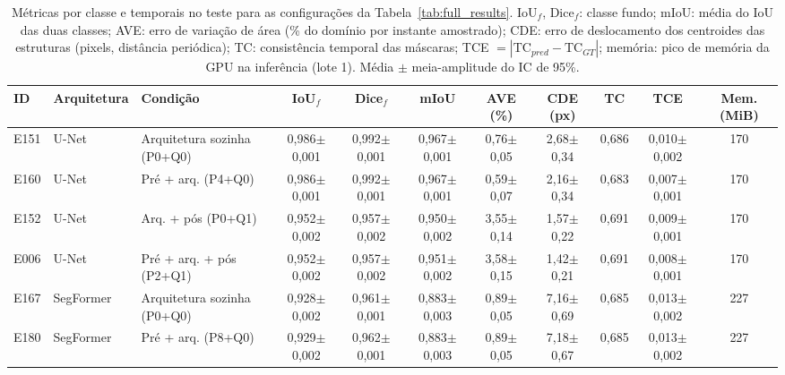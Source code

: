 \begin{table}[t]
\centering
\caption{Métricas por classe e temporais no teste para as configurações da Tabela~\ref{tab:full_results}. IoU$_{f}$, Dice$_{f}$: classe fundo; mIoU: média do IoU das duas classes; AVE: erro de variação de área (\% do domínio por instante amostrado); CDE: erro de deslocamento dos centroides das estruturas (pixels, distância periódica); TC: consistência temporal das máscaras; TCE $=|\mathrm{TC}_{pred}-\mathrm{TC}_{GT}|$; memória: pico de memória da GPU na inferência (lote 1). Média $\pm$ meia-amplitude do IC de 95\%.}
\label{tab:classwise_temporal}
\scriptsize
\setlength{\tabcolsep}{3pt}
\begin{tabularx}{\textwidth}{L{0.7cm} L{1.6cm} Y c c c c c c c c}
\toprule
\textbf{ID} & \textbf{Arquitetura} & \textbf{Condição} & \textbf{IoU$_{f}$} & \textbf{Dice$_{f}$} & \textbf{mIoU} & \textbf{AVE (\%)} & \textbf{CDE (px)} & \textbf{TC} & \textbf{TCE} & \textbf{Mem. (MiB)} \\
\midrule
E151 & U-Net & Arquitetura sozinha (P0+Q0) & 0,986{\scriptsize$\pm$0,001} & 0,992{\scriptsize$\pm$0,001} & 0,967{\scriptsize$\pm$0,001} & 0,76{\scriptsize$\pm$0,05} & 2,68{\scriptsize$\pm$0,34} & 0,686 & 0,010{\scriptsize$\pm$0,002} & 170 \\
E160 & U-Net & Pré + arq. (P4+Q0) & 0,986{\scriptsize$\pm$0,001} & 0,992{\scriptsize$\pm$0,001} & 0,967{\scriptsize$\pm$0,001} & 0,59{\scriptsize$\pm$0,07} & 2,16{\scriptsize$\pm$0,34} & 0,683 & 0,007{\scriptsize$\pm$0,001} & 170 \\
E152 & U-Net & Arq. + pós (P0+Q1) & 0,952{\scriptsize$\pm$0,002} & 0,957{\scriptsize$\pm$0,002} & 0,950{\scriptsize$\pm$0,002} & 3,55{\scriptsize$\pm$0,14} & 1,57{\scriptsize$\pm$0,22} & 0,691 & 0,009{\scriptsize$\pm$0,001} & 170 \\
E006 & U-Net & Pré + arq. + pós (P2+Q1) & 0,952{\scriptsize$\pm$0,002} & 0,957{\scriptsize$\pm$0,002} & 0,951{\scriptsize$\pm$0,002} & 3,58{\scriptsize$\pm$0,15} & 1,42{\scriptsize$\pm$0,21} & 0,691 & 0,008{\scriptsize$\pm$0,001} & 170 \\
\addlinespace
E167 & SegFormer & Arquitetura sozinha (P0+Q0) & 0,928{\scriptsize$\pm$0,002} & 0,961{\scriptsize$\pm$0,001} & 0,883{\scriptsize$\pm$0,003} & 0,89{\scriptsize$\pm$0,05} & 7,16{\scriptsize$\pm$0,69} & 0,685 & 0,013{\scriptsize$\pm$0,002} & 227 \\
E180 & SegFormer & Pré + arq. (P8+Q0) & 0,929{\scriptsize$\pm$0,002} & 0,962{\scriptsize$\pm$0,001} & 0,883{\scriptsize$\pm$0,003} & 0,89{\scriptsize$\pm$0,05} & 7,18{\scriptsize$\pm$0,67} & 0,685 & 0,013{\scriptsize$\pm$0,002} & 227 \\

\end{tabularx}
\end{table}
